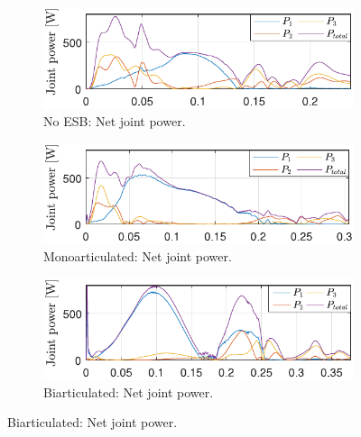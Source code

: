 \documentclass[letterpaper, 10 pt, conference]{ieeeconf}  %
\begin{document}
\begin{figure}[ht]
	\begin{subfigure}[t]{0.32\linewidth}
		\includegraphics[width=\linewidth]{noESB/P_q}
		\caption{No ESB: Net joint power.}
		\label{fig:noESB_P_q}
	\end{subfigure}
	\begin{subfigure}[t]{0.32\linewidth}
		\includegraphics[width=\linewidth]{mono/P_q}
		\caption{Monoarticulated: Net joint power.}
		\label{fig:mono_P_q}
	\end{subfigure}
	\begin{subfigure}[t]{0.32\linewidth}
		\includegraphics[width=\linewidth]{bi/P_q}
		\caption{Biarticulated: Net joint power.}
		\label{fig:bi_P_q}
	\end{subfigure}
	
	\vspace{1mm}
	

\end{figure}
\end{document}
